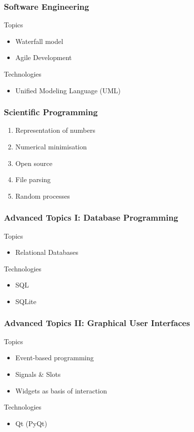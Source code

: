\begin{frame}[fragile]
\frametitle{Software Engineering}

\begin{block}{Topics}
\begin{itemize}
\item Waterfall model
\item Agile Development
\end{itemize}
\end{block}
\begin{block}{Technologies}
\begin{itemize}
\item Unified Modeling Language (UML) 
\end{itemize}
\end{block}
\end{frame}

\begin{frame}[fragile]
\frametitle{Scientific Programming}
\begin{enumerate}
\item Representation of numbers
\item Numerical minimisation
\item Open source
\item File parsing
\item Random processes
\end{enumerate}
\end{frame}

\begin{frame}[fragile]
\frametitle{Advanced Topics I: Database Programming}
\begin{block}{Topics}
\begin{itemize}
\item Relational Databases
\end{itemize}
\end{block}
\begin{block}{Technologies}
\begin{itemize}
\item SQL
\item SQLite
\end{itemize}
\end{block}
\end{frame}

\begin{frame}[fragile]
\frametitle{Advanced Topics II: Graphical User Interfaces}
\begin{block}{Topics}
\begin{itemize}
\item Event-based programming
\item Signals \& Slots
\item Widgets as basis of interaction
\end{itemize}
\end{block}

\begin{block}{Technologies}
\begin{itemize}
\item Qt (PyQt)
\end{itemize}
\end{block}
\end{frame}

